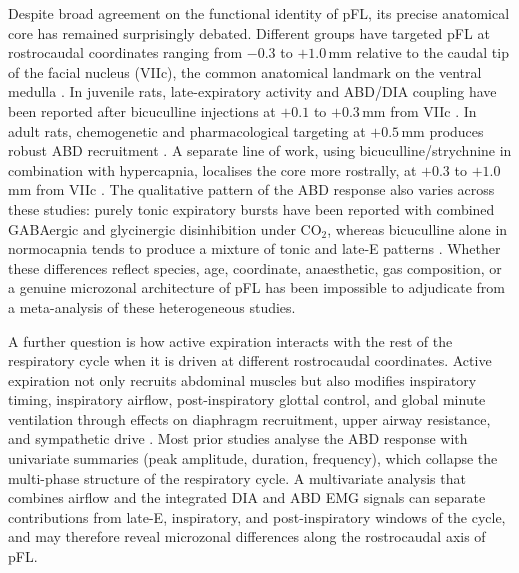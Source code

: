 \documentclass[11pt]{article}
\begin{document}
Despite broad agreement on the functional identity of pFL, its precise
anatomical core has remained surprisingly debated. Different groups have
targeted pFL at rostrocaudal coordinates ranging from $-0.3$ to $+1.0$\,mm
relative to the caudal tip of the facial nucleus (VIIc), the common
anatomical landmark on the ventral medulla
\citep{Pagliardini2011Active,Huckstepp2015Role,deBritto2017GABAergic,Silva2019Importance,Boutin2017Respiratory}.
In juvenile rats, late-expiratory activity and ABD/DIA coupling have been
reported after bicuculline injections at $+0.1$ to $+0.3$\,mm from VIIc
\citep{deBritto2017GABAergic}. In adult rats, chemogenetic and
pharmacological targeting at $+0.5$\,mm produces robust ABD recruitment
\citep{Huckstepp2015Role,Pagliardini2011Active}. A separate line of work,
using bicuculline/strychnine in combination with hypercapnia, localises
the core more rostrally, at $+0.3$ to $+1.0$\,mm from VIIc
\citep{Silva2019Importance}. The qualitative pattern of the ABD response
also varies across these studies: purely tonic expiratory bursts have
been reported with combined GABAergic and glycinergic disinhibition under
CO$_2$, whereas bicuculline alone in normocapnia tends to produce a
mixture of tonic and late-E patterns
\citep{Pagliardini2011Active,deBritto2017GABAergic,Silva2019Importance}.
Whether these differences reflect species, age, coordinate, anaesthetic,
gas composition, or a genuine microzonal architecture of pFL has been
impossible to adjudicate from a meta-analysis of these heterogeneous
studies.

A further question is how active expiration interacts with the rest of
the respiratory cycle when it is driven at different rostrocaudal
coordinates. Active expiration not only recruits abdominal muscles but
also modifies inspiratory timing, inspiratory airflow, post-inspiratory
glottal control, and global minute ventilation through effects on
diaphragm recruitment, upper airway resistance, and sympathetic drive
\citep{Molkov2010Computational,Dutschmann2006Pontine,Zoccal2018Expiratory,Barnett2017Partial,Dhingra2020LateE}.
Most prior studies analyse the ABD response with univariate summaries
(peak amplitude, duration, frequency), which collapse the multi-phase
structure of the respiratory cycle. A multivariate analysis that combines
airflow and the integrated DIA and ABD EMG signals can separate
contributions from late-E, inspiratory, and post-inspiratory windows of
the cycle, and may therefore reveal microzonal differences along the
rostrocaudal axis of pFL.
\end{document}
